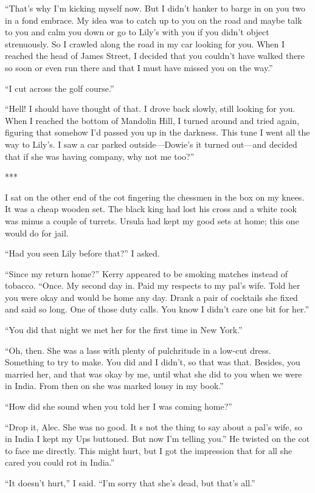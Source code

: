 \documentclass{novel}
\begin{document}
“That’s why I’m kicking myself now. But I didn’t hanker to barge in on you two in a fond embrace. My idea was to catch up to you on the road and maybe talk to you and calm you down or go to Lily’s with you if you didn’t object strenuously. So I crawled along the road in my car looking for you. When I reached the head of James Street, I decided that you couldn’t have walked there so soon or even run there and that I must have missed you on the way.”

“I cut across the golf course.”

“Hell! I should have thought of that. I drove back slowly, still looking for you. When I reached the bottom of Mandolin Hill, I turned around and tried again, figuring that somehow I’d passed you up in the darkness. This tune I went all the way to Lily’s. I saw a car parked outside—Dowie’s it turned out—and decided that if she was having company, why not me too?”

***

I sat on the other end of the cot fingering the chessmen in the box on my knees. It was a cheap wooden set. The black king had lost his cross and a white rook was minus a couple of turrets. Ursula had kept my good sets at home; this one would do for jail.

“Had you seen Lily before that?” I asked.

“Since my return home?” Kerry appeared to be smoking matches instead of tobacco. “Once. My second day in. Paid my respects to my pal’s wife. Told her you were okay and would be home any day. Drank a pair of cocktails she fixed and said so long. One of those duty calls. You know I didn’t care one bit for her.”

“You did that night we met her for the first time in New York.”

“Oh, then. She was a lass with plenty of pulchritude in a low-cut dress. Something to try to make. You did and I didn’t, so that was that. Besides, you married her, and that was okay by me, until what she did to you when we were in India. From then on she was marked lousy in my book.”

“How did she sound when you told her I was coming home?”

“Drop it, Alec. She was no good. It s not the thing to say about a pal’s wife, so in India I kept my Ups buttoned. But now I’m telling you.” He twisted on the cot to face me directly. This might hurt, but I got the impression that for all she cared you could rot in India.”

“It doesn’t hurt,” I said. “I’m sorry that she’s dead, but that’s all.”
\end{document}
